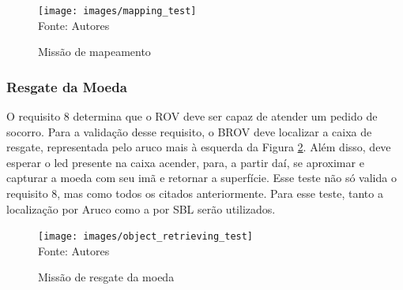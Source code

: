 \begin{figure}[h]
	\centering
	\caption{Missão de mapeamento}
	\label{fig:mappingtest}
	\texttt{[image: images/mapping\_test]}\\
	\footnotesize Fonte: Autores
\end{figure}

\subsubsection*{Resgate da Moeda}
O requisito 8 determina que o ROV deve ser capaz de atender um pedido de socorro. Para a validação desse requisito, o BROV deve localizar a caixa de resgate, representada pelo aruco mais à esquerda da Figura \ref{fig:objectretrievingtest}. Além disso, deve esperar o led presente na caixa acender, para, a partir daí, se aproximar e capturar a moeda com seu imã e retornar a superfície. Esse teste não só valida o requisito 8, mas como todos os citados anteriormente. Para esse teste, tanto a localização por Aruco como a por SBL serão utilizados.

\begin{figure}[h]
	\centering
	\caption{Missão de resgate da moeda}
	\label{fig:objectretrievingtest}
	\texttt{[image: images/object\_retrieving\_test]}\\
	\footnotesize Fonte: Autores
\end{figure}


